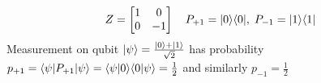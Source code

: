 			\begin{xmpl}
      \begin{equation*} %
				Z = \begin{bmatrix} 1 & 0 \\ 0 & -1 \end{bmatrix} \quad P_{+1} = \proj{0} , \; P_{-1} = \proj{1}
      \end{equation*}
				Measurement on qubit $ |\psi \rangle = \frac{|0 \rangle + |1 \rangle}{\sqrt{2}} $ has probability $p_{+1} = \langle \psi|P_{+1}|\psi \rangle = \langle\psi|0\rangle\langle0|\psi\rangle = \frac{1}{2}$ and similarly $p_{-1} = \frac{1}{2}$
				\cite{NC10}
			\end{xmpl}
	

